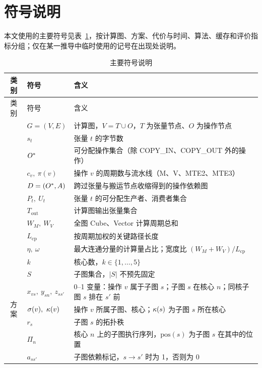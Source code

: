 \section{符号说明}

本文使用的主要符号见表~\ref{tab:symbols}，按计算图、方案、代价与时间、算法、缓存和评价指标分组；仅在某一推导中临时使用的记号在出现处说明。

\begin{footnotesize}
\renewcommand\arraystretch{1.12}
\begin{longtable}{c p{3.3cm} p{9.6cm}}
\caption{主要符号说明}\label{tab:symbols}\\
\toprule
类别 & 符号 & 含义 \\
\midrule
\endfirsthead
\toprule
类别 & 符号 & 含义 \\
\midrule
\endhead
\bottomrule
\endfoot
\multirow{10}{*}{计算图}
 & $G=(V,E)$ & 计算图，$V=T\cup O$，$T$ 为张量节点、$O$ 为操作节点 \\
 & $s_t$ & 张量 $t$ 的字节数 \\
 & $O^{\ast}$ & 可分配操作集合（除 COPY\_IN、COPY\_OUT 外的操作） \\
 & $c_v,\ \pi(v)$ & 操作 $v$ 的周期数与流水线（M、V、MTE2、MTE3） \\
 & $D=(O^{\ast},A)$ & 跨过张量与搬运节点收缩得到的操作依赖图 \\
 & $P_t,\ U_t$ & 张量 $t$ 的可分配生产者、消费者集合 \\
 & $T_{\mathrm{out}}$ & 计算图输出张量集合 \\
 & $W_M,\ W_V$ & 全图 Cube、Vector 计算周期总和 \\
 & $L_{\mathrm{cp}}$ & 按周期加权的关键路径长度 \\
 & $\eta,\ \omega$ & 最大连通分量的计算量占比；宽度比 $(W_M+W_V)/L_{\mathrm{cp}}$ \\
\midrule
\multirow{9}{*}{方案}
 & $k$ & 核心数，$k\in\{1,\dots,5\}$ \\
 & $S$ & 子图集合，$|S|$ 不预先固定 \\
 & $x_{vs},\ y_{sn},\ z_{ss'}$ & 0--1 变量：操作 $v$ 属于子图 $s$；子图 $s$ 在核心 $n$；同核子图 $s$ 排在 $s'$ 前 \\
 & $\sg(v),\ \core(v)$ & 操作 $v$ 所属子图、核心；$\kappa(s)$ 为子图 $s$ 所在核心 \\
 & $r_s$ & 子图 $s$ 的拓扑秩 \\
 & $\Pi_n$ & 核心 $n$ 上的子图执行序列，$\mathrm{pos}(s)$ 为子图 $s$ 在其中的位置 \\
 & $a_{ss'}$ & 子图依赖标记，$s\to s'$ 时为 1，否则为 0 \\

\end{longtable}
\end{footnotesize}
